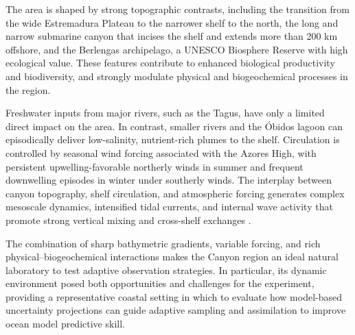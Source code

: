 The \naz area is shaped by strong topographic contrasts, including the
transition from the wide Estremadura Plateau to the narrower shelf to
the north, the long and narrow \naz submarine canyon that incises the
shelf and extends more than 200 km offshore, and the Berlengas
archipelago, a UNESCO Biosphere Reserve with high ecological
value. These features contribute to enhanced biological productivity
and biodiversity, and strongly modulate physical and biogeochemical
processes in the region.

Freshwater inputs from major rivers, such as the Tagus, have only a
limited direct impact on the area. In contrast, smaller rivers and the
\'{O}bidos lagoon can episodically deliver low-salinity, nutrient-rich
plumes to the shelf. Circulation is controlled by seasonal wind
forcing associated with the Azores High, with persistent
upwelling-favorable northerly winds in summer and frequent downwelling
episodes in winter under southerly winds. The interplay between canyon
topography, shelf circulation, and atmospheric forcing generates
complex mesoscale dynamics, intensified tidal currents, and internal
wave activity that promote strong vertical mixing and cross-shelf
exchanges \cite{martins10,quaresma07}.

The combination of sharp bathymetric gradients, variable forcing, and
rich physical–biogeochemical interactions makes the \naz Canyon region
an ideal natural laboratory to test adaptive observation
strategies. In particular, its dynamic environment posed both
opportunities and challenges for the \proj experiment, providing a
representative coastal setting in which to evaluate how model-based
uncertainty projections can guide adaptive sampling and assimilation
to improve ocean model predictive skill.
